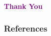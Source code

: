 \documentclass{beamer}
\begin{document}
\begin{frame}{}
  \centering
  \textcolor{purple}{\textbf{Thank You}}
\end{frame}

\nocite{*}

\begin{frame}
  \frametitle{References}
  \printbibliography
\end{frame}
\end{document}

